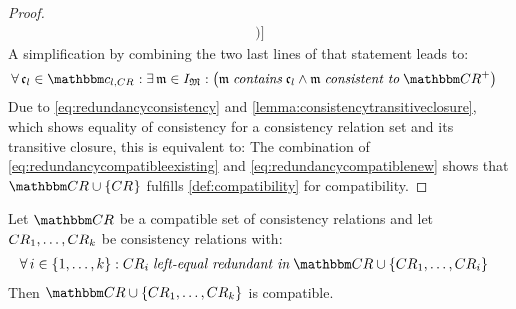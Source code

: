 \begin{proof}
\begin{align*}
            \big)
        \big]
    \end{align*}
    A simplification by combining the two last lines of that statement leads to:
    \begin{align*}
        & \nonumber 
        \forall \conditionelement{c}{l} \in \condition{c}{l, \consistencyrelation{CR}{}} : \exists \modeltuple{m} \in \metamodeltupleinstanceset{M} : 
        \big(
            \modeltuple{m} \containsmath \conditionelement{c}{l} \land \modeltuple{m} \consistenttomath \transitiveclosure{\consistencyrelationset{CR}} 
        \big)
    \end{align*}
    Due to \autoref{eq:redundancyconsistency} and \autoref{lemma:consistencytransitiveclosure}, which shows equality of consistency for a consistency relation set and its transitive closure, this is equivalent to:
    The combination of \autoref{eq:redundancycompatibleexisting} and \autoref{eq:redundancycompatiblenew} shows that $\consistencyrelationset{CR} \cup \setted{\consistencyrelation{CR}{}}$ fulfills \autoref{def:compatibility} for compatibility.
\end{proof}

\begin{corollary} \label{corollary:transitiveredundancycompatibility}
    Let $\consistencyrelationset{CR}$ be a compatible set of consistency relations and let $\consistencyrelation{CR}{1}, \dots, \consistencyrelation{CR}{k}$ be consistency relations with:
    \begin{align*}
        &
        \forall i \in \setted{1, \dots, k} : \consistencyrelation{CR}{i} \leftequalredundantinmath \consistencyrelationset{CR} \cup \setted{\consistencyrelation{CR}{1}, \dots, \consistencyrelation{CR}{i}}
    \end{align*}
    Then $\consistencyrelationset{CR} \cup \setted{\consistencyrelation{CR}{1}, \dots, \consistencyrelation{CR}{k}}$ is compatible.
\end{corollary}

